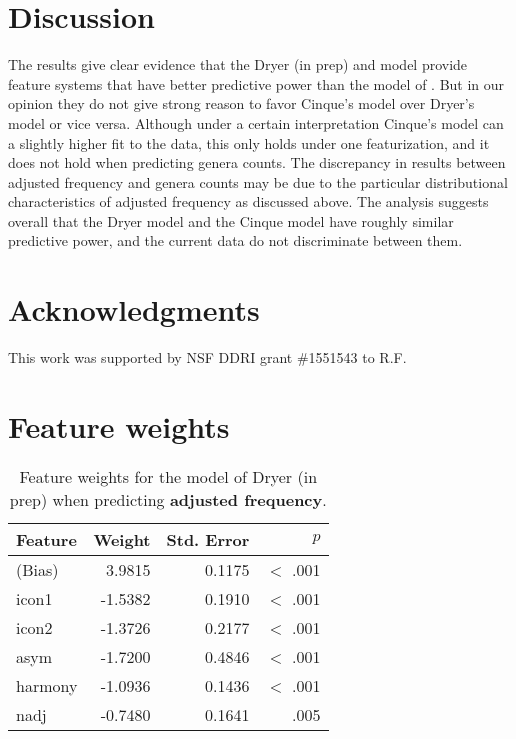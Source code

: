 \documentclass[11pt]{article}
\newcommand{\lt}{<}
\begin{document}
\section{Discussion}

The results give clear evidence that the Dryer (in prep) and \citet{cinque2005deriving} model provide feature systems that have better predictive power than the model of \citet{cysouw2010dealing}. But in our opinion they do not give strong reason to favor Cinque's model over Dryer's model or vice versa. Although under a certain interpretation Cinque's model can a slightly higher fit to the data, this only holds under one featurization, and it does not hold when predicting genera counts. The discrepancy in results between adjusted frequency and genera counts may be due to the particular distributional characteristics of adjusted frequency as discussed above. The analysis suggests overall that the Dryer model and the Cinque model have roughly similar predictive power, and the current data do not discriminate between them.


\section*{Acknowledgments} 

This work was supported by NSF DDRI grant \#1551543 to R.F.

\nocite{dryer2017order}




\appendix
\section{Feature weights}
\begin{table}[ht!]
  \centering
  \begin{tabular}{|l|r|r|r|}
    \hline
    Feature & Weight & Std. Error & $p$ \\
    \hline
    (Bias) &  3.9815  &   0.1175 &  $\lt$ .001 \\
    icon1  & -1.5382  &   0.1910 &  $\lt$ .001 \\
    icon2  & -1.3726 &      0.2177 &  $\lt$ .001 \\
    asym  &  -1.7200 &      0.4846 &  $\lt$ .001 \\
    harmony &     -1.0936   &  0.1436 & $\lt$ .001 \\
    nadj    &     -0.7480  &   0.1641 & .005    \\
    \hline
  \end{tabular}
  \caption{Feature weights for the model of Dryer (in prep) when predicting \textbf{adjusted frequency}.}
\end{table}
\end{document}
